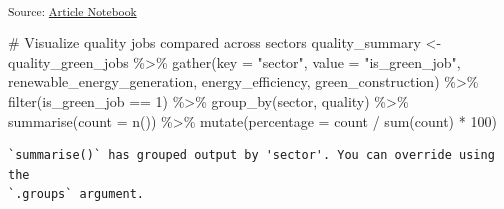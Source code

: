 \documentclass[
  letterpaper,
  DIV=11,
  numbers=noendperiod]{scrartcl}
\newenvironment{Shaded}{\begin{snugshade}}{\end{snugshade}}
\newcommand{\AttributeTok}[1]{\textcolor[rgb]{0.40,0.45,0.13}{#1}}
\newcommand{\CommentTok}[1]{\textcolor[rgb]{0.37,0.37,0.37}{#1}}
\newcommand{\DecValTok}[1]{\textcolor[rgb]{0.68,0.00,0.00}{#1}}
\newcommand{\FunctionTok}[1]{\textcolor[rgb]{0.28,0.35,0.67}{#1}}
\newcommand{\NormalTok}[1]{\textcolor[rgb]{0.00,0.23,0.31}{#1}}
\newcommand{\OtherTok}[1]{\textcolor[rgb]{0.00,0.23,0.31}{#1}}
\newcommand{\SpecialCharTok}[1]{\textcolor[rgb]{0.37,0.37,0.37}{#1}}
\newcommand{\StringTok}[1]{\textcolor[rgb]{0.13,0.47,0.30}{#1}}
\begin{document}
\textsubscript{Source:
\href{https://beeckcenter.github.io/climate-equity-workforce/index-preview.html}{Article
Notebook}}

\begin{Shaded}
\begin{Highlighting}[]
\CommentTok{\# Visualize quality jobs compared across sectors}
\NormalTok{quality\_summary }\OtherTok{\textless{}{-}}\NormalTok{ quality\_green\_jobs }\SpecialCharTok{\%\textgreater{}\%}
  \FunctionTok{gather}\NormalTok{(}\AttributeTok{key =} \StringTok{"sector"}\NormalTok{, }\AttributeTok{value =} \StringTok{"is\_green\_job"}\NormalTok{, renewable\_energy\_generation, energy\_efficiency, green\_construction) }\SpecialCharTok{\%\textgreater{}\%}
  \FunctionTok{filter}\NormalTok{(is\_green\_job }\SpecialCharTok{==} \DecValTok{1}\NormalTok{) }\SpecialCharTok{\%\textgreater{}\%}
  \FunctionTok{group\_by}\NormalTok{(sector, quality) }\SpecialCharTok{\%\textgreater{}\%}
  \FunctionTok{summarise}\NormalTok{(}\AttributeTok{count =} \FunctionTok{n}\NormalTok{()) }\SpecialCharTok{\%\textgreater{}\%}
  \FunctionTok{mutate}\NormalTok{(}\AttributeTok{percentage =}\NormalTok{ count }\SpecialCharTok{/} \FunctionTok{sum}\NormalTok{(count) }\SpecialCharTok{*} \DecValTok{100}\NormalTok{)}
\end{Highlighting}
\end{Shaded}

\begin{verbatim}
`summarise()` has grouped output by 'sector'. You can override using the
`.groups` argument.
\end{verbatim}
\end{document}
